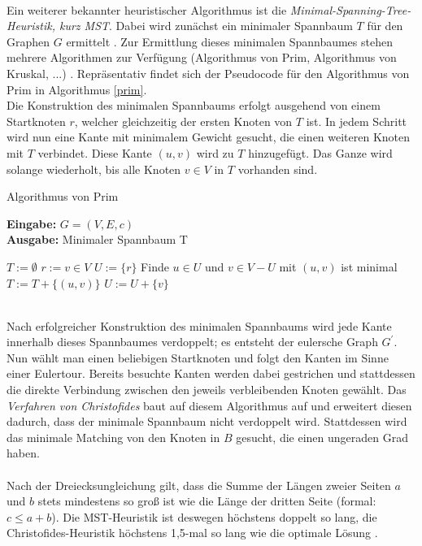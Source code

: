 \documentclass[doktyp=barbeit, sprache=german]{TUBAFarbeiten}
\begin{document}
\\Ein weiterer bekannter heuristischer Algorithmus ist die \textit{Minimal-Spanning-Tree-Heuristik, kurz MST}. Dabei wird zunächst ein minimaler Spannbaum $T$ für den Graphen $G$ ermittelt \cite{Groetschel2005}. Zur Ermittlung dieses minimalen Spannbaumes stehen mehrere Algorithmen zur Verfügung (Algorithmus von Prim, Algorithmus von Kruskal, ...) \cite{MST}. Repräsentativ findet sich der Pseudocode für den Algorithmus von Prim in Algorithmus \ref{prim}. 
\\Die Konstruktion des minimalen Spannbaums erfolgt ausgehend von einem Startknoten $r$, welcher gleichzeitig der ersten Knoten von $T$ ist. In jedem Schritt wird nun eine Kante mit minimalem Gewicht gesucht, die einen weiteren Knoten mit $T$ verbindet. Diese Kante $(u,v)$ wird zu $T$ hinzugefügt. Das Ganze wird solange wiederholt, bis alle Knoten $v \in V$ in $T$ vorhanden sind. 
\begin{algorithm}
\caption{Algorithmus von Prim}
\label{prim}
\textbf{Eingabe:} $G = (V,E,c)$
\\\textbf{Ausgabe:} Minimaler Spannbaum T
\begin{algorithmic}[1]
\State $T := \emptyset$
\State $r := v \in V$
\State $U := \{r\}$
\State Finde $u \in U$ und $v \in V - U$ mit $(u,v)$ ist minimal
\State $T := T + \{(u,v)\}$
\State $U := U + \{v\}$
\EndWhile
\end{algorithmic}
\end{algorithm}
\\Nach erfolgreicher Konstruktion des minimalen Spannbaums wird jede Kante innerhalb dieses Spannbaumes verdoppelt; es entsteht der eulersche Graph $G^\prime$. Nun wählt man einen beliebigen Startknoten und folgt den Kanten im Sinne einer Eulertour. Bereits besuchte Kanten werden dabei gestrichen und stattdessen die direkte Verbindung zwischen den jeweils verbleibenden Knoten gewählt. Das \textit{Verfahren von Christofides} baut auf diesem Algorithmus auf und erweitert diesen dadurch, dass der minimale Spannbaum nicht verdoppelt wird. Stattdessen wird das minimale Matching von den Knoten in $B$ gesucht, die einen ungeraden Grad haben. 
\\\\Nach der Dreiecksungleichung gilt, dass die Summe der Längen zweier Seiten $a$ und $b$ stets mindestens so groß ist wie die Länge der dritten Seite (formal: $c \leq a + b$). Die MST-Heuristik ist deswegen höchstens doppelt so lang, die Christofides-Heuristik höchstens 1,5-mal so lang wie die optimale Lösung \cite{Groetschel2005}.
\end{document}
